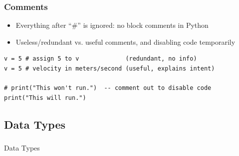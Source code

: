 \begin{frame}[fragile]\frametitle{Comments}
\begin{itemize}
\item Everything after ``\#'' is ignored: no block comments in Python
\item Useless/redundant vs. useful comments, and disabling code temporarily
\end{itemize}
\begin{lstlisting}
v = 5 # assign 5 to v             (redundant, no info)
v = 5 # velocity in meters/second (useful, explains intent)

# print("This won't run.")  -- comment out to disable code
print("This will run.")
\end{lstlisting}
\end{frame}







\subsection{Data Types}
\begin{frame}[fragile]\frametitle{}
\begin{center}
{\Large Data Types}
\end{center}
\end{frame}


